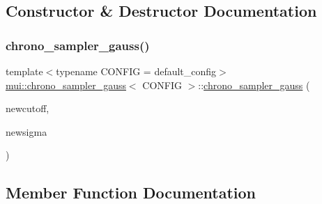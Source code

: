 \subsection{Constructor \& Destructor Documentation}
\mbox{\label{classmui_1_1chrono__sampler__gauss_a0f89e81a457ebb15623fc4d0ad25cea5}} 
\subsubsection{\texorpdfstring{chrono\+\_\+sampler\+\_\+gauss()}{chrono\_sampler\_gauss()}}
{\footnotesize\ttfamily template$<$typename C\+O\+N\+F\+IG  = default\+\_\+config$>$ \\
\hyperlink{classmui_1_1chrono__sampler__gauss}{mui\+::chrono\+\_\+sampler\+\_\+gauss}$<$ C\+O\+N\+F\+IG $>$\+::\hyperlink{classmui_1_1chrono__sampler__gauss}{chrono\+\_\+sampler\+\_\+gauss} (\begin{DoxyParamCaption}\item[{\hyperlink{classmui_1_1chrono__sampler__gauss_accb8778472734fd419da15b26e087a41}{time\+\_\+type}}]{newcutoff,  }\item[{\hyperlink{classmui_1_1chrono__sampler__gauss_acb55ad8350ad77bd80ea3979bc01f7a5}{R\+E\+AL}}]{newsigma }\end{DoxyParamCaption})\hspace{0.3cm}{\ttfamily [inline]}}



\subsection{Member Function Documentation}
\mbox{\label{classmui_1_1chrono__sampler__gauss_a6757bf02147d08582cc5f16910ac3a91}} 
